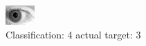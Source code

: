 \begin{figure}[h!]
\begin{center}
\includegraphics[width=0.60\columnwidth]{figures/ID230_class_4_target_3.png}
\end{center}
\caption{ Classification: 4 actual target: 3}
\label{fig:ID230_class_4_target_3}
\end{figure}
